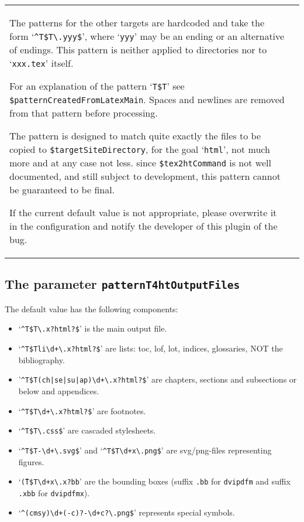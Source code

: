 \begin{longtable}{|ll|}
{\begin{minipage}{0.95\linewidth}
The patterns for the other targets 
are hardcoded and take the form 
`\texttt{\^{}T\$T\textbackslash.yyy\$}', where `\texttt{yyy}' 
may be an ending or an alternative of endings. 
This pattern is neither applied to directories 
nor to `\texttt{xxx.tex}' itself. 
 
For an explanation of the pattern `\texttt{T\$T}' 
see \texttt{\$patternCreatedFromLatexMain}. 
Spaces and newlines are removed 
from that pattern before processing. 

The pattern is designed to match quite exactly 
the files to be copied to \texttt{\$targetSiteDirectory}, 
for the goal `\texttt{html}', 
not much more and at any case not less. 
since \texttt{\$tex2htCommand} is not well documented, 
and still subject to development, 
this pattern cannot be guaranteed to be final. 

If the current default value is not appropriate, 
please overwrite it in the configuration 
and notify the developer of this plugin of the bug. 
\end{minipage}
} \\
\end{longtable}


\subsection{The parameter \texttt{patternT4htOutputFiles}}
\label{subsec:patternT4htOutputFiles}



The default value has the following components: 
%
\begin{itemize}
\item
`\texttt{\^{}T\$T\textbackslash.x?html?\$}' is the main output file. 
\item
`\texttt{\^{}T\$Tli\textbackslash d+\textbackslash.x?html?\$}' are lists: 
toc, lof, lot, indices, glossaries, NOT the bibliography. 
\item
'\texttt{\^{}T\$T(ch|se|su|ap)\textbackslash d+\textbackslash.x?html?\$}' 
are chapters, sections and subsections or below 
and appendices. 
\item
`\texttt{\^{}T\$T\textbackslash d+\textbackslash.x?html?\$}' are footnotes. 
\item
`\texttt{\^{}T\$T\textbackslash.css\$}' are cascaded stylesheets. 
\item
`\texttt{\^{}T\$T-\textbackslash d+\textbackslash.svg\$}' and 
`\texttt{\^{}T\$T\textbackslash d+x\textbackslash.png\$}' 
are svg/png-files representing figures. 
\item
`\texttt{\^({}T\$T\textbackslash d+x\textbackslash.x?bb}' 
are the bounding boxes 
(suffix \texttt{.bb}  for \texttt{dvipdfm} and 
 suffix \texttt{.xbb} for \texttt{dvipdfmx}). 
\item
`\texttt{\^{}(cmsy)\textbackslash d+(-c)?-\textbackslash d+c?\textbackslash.png\$}' 
represents special symbols. 
\end{itemize}
		 
